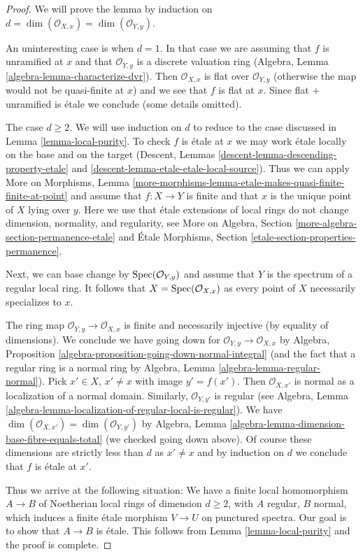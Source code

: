 \begin{proof}
We will prove the lemma by induction on
$d = \dim(\mathcal{O}_{X, x}) = \dim(\mathcal{O}_{Y, y})$.

\medskip\noindent
An uninteresting case is when $d = 1$.
In that case we are assuming that $f$ is unramified at $x$
and that $\mathcal{O}_{Y, y}$ is a discrete valuation ring
(Algebra, Lemma \ref{algebra-lemma-characterize-dvr}).
Then $\mathcal{O}_{X, x}$ is flat over $\mathcal{O}_{Y, y}$
(otherwise the map would not be quasi-finite at $x$)
and we see that $f$ is flat at $x$. Since flat $+$
unramified is \'etale we conclude (some details omitted).

\medskip\noindent
The case $d \geq 2$. We will use induction on $d$ to reduce
to the case discussed in Lemma \ref{lemma-local-purity}.
To check $f$ is \'etale at $x$ we may work \'etale locally
on the base and on the target
(Descent, Lemmas \ref{descent-lemma-descending-property-etale} and
\ref{descent-lemma-etale-etale-local-source}).
Thus we can apply More on Morphisms, Lemma
\ref{more-morphisms-lemma-etale-makes-quasi-finite-finite-at-point}
and assume that $f : X \to Y$ is finite and that $x$ is the unique
point of $X$ lying over $y$. Here we use that \'etale extensions of
local rings do not change dimension, normality, and regularity, see
More on Algebra, Section \ref{more-algebra-section-permanence-etale}
and
\'Etale Morphisms, Section \ref{etale-section-properties-permanence}.

\medskip\noindent
Next, we can base change by $\mathop{\mathrm{Spec}}(\mathcal{O}_{Y, y})$
and assume that $Y$ is the spectrum of a regular local ring.
It follows that $X = \mathop{\mathrm{Spec}}(\mathcal{O}_{X, x})$ as
every point of $X$ necessarily specializes to $x$.

\medskip\noindent
The ring map $\mathcal{O}_{Y, y} \to \mathcal{O}_{X, x}$ is
finite and necessarily injective (by equality of dimensions).
We conclude we have going down for
$\mathcal{O}_{Y, y} \to \mathcal{O}_{X, x}$ by
Algebra, Proposition \ref{algebra-proposition-going-down-normal-integral}
(and the fact that a regular ring is a normal ring by
Algebra, Lemma \ref{algebra-lemma-regular-normal}).
Pick $x' \in X$, $x' \not = x$ with image $y' = f(x')$.
Then $\mathcal{O}_{X, x'}$ is normal as a localization
of a normal domain. Similarly, $\mathcal{O}_{Y, y'}$ is
regular (see Algebra, Lemma
\ref{algebra-lemma-localization-of-regular-local-is-regular}).
We have $\dim(\mathcal{O}_{X, x'}) = \dim(\mathcal{O}_{Y, y'})$ by
Algebra, Lemma \ref{algebra-lemma-dimension-base-fibre-equals-total}
(we checked going down above).
Of course these dimensions are strictly less than $d$ as $x' \not = x$
and by induction on $d$ we conclude that $f$ is \'etale at $x'$.

\medskip\noindent
Thus we arrive at the following situation: We have a finite
local homomorphism $A \to B$ of Noetherian local rings
of dimension $d \geq 2$, with $A$ regular, $B$ normal, which
induces a finite \'etale morphism $V \to U$ on punctured spectra.
Our goal is to show that $A \to B$ is \'etale.
This follows from Lemma \ref{lemma-local-purity}
and the proof is complete.
\end{proof}

